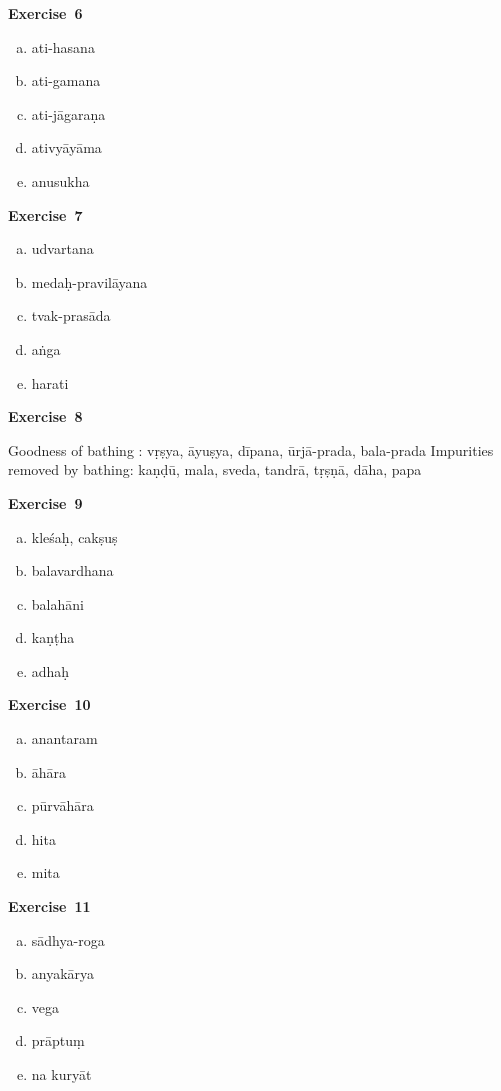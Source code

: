 \begin{multicols}{2}
\noindent\textbf{Exercise~6}
\vspace{-10pt}
\begin{enumerate}[a.]
\itemsep=0pt
\item ati-hasana
\item ati-gamana
\item ati-jāgaraṇa
\item ativyāyāma
\item anusukha
\end{enumerate}

\noindent\textbf{Exercise~7}
\vspace{-10pt}
\begin{enumerate}[a.]
\itemsep=0pt
\item udvartana
\item medaḥ-pravilāyana
\item tvak-prasāda
\item aṅga
\item harati
\end{enumerate}

\noindent\textbf{Exercise~8}

Goodness of bathing : vṛṣya, āyuṣya, dīpana, ūrjā-prada, bala-prada Impurities removed by bathing: kaṇḍū, mala, sveda, tandrā, tṛṣṇā, dāha, papa

\noindent\textbf{Exercise~9}
\vspace{-10pt}
\begin{enumerate}[a.]
\itemsep=0pt
\item kleśaḥ, cakṣuṣ 
\item balavardhana 
\item balahāni
\item kaṇṭha
\item adhaḥ
\end{enumerate}

\noindent\textbf{Exercise~10}
\vspace{-10pt}
\begin{enumerate}[a.]
\itemsep=0pt
\item anantaram
\item āhāra
\item pūrvāhāra 
\item hita
\item mita
\end{enumerate}

\noindent\textbf{Exercise~11}
\vspace{-10pt}
\begin{enumerate}[a.]
\itemsep=0pt
\item sādhya-roga
\item anyakārya
\item vega 
\item prāptuṃ
\item na kuryāt
\end{enumerate}


\end{multicols}
